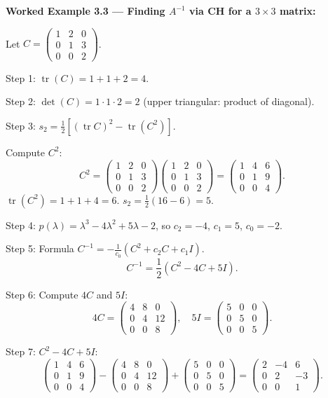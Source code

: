 \documentclass[12pt,a4paper]{article}
\begin{document}
\textbf{Worked Example 3.3 --- Finding $A^{-1}$ via CH for a $3\times3$ matrix:}

Let $C = \begin{pmatrix} 1 & 2 & 0 \\ 0 & 1 & 3 \\ 0 & 0 & 2 \end{pmatrix}$.

Step 1: $\operatorname{tr}(C) = 1+1+2 = 4$.

Step 2: $\det(C) = 1\cdot1\cdot2 = 2$ (upper triangular: product of diagonal).

Step 3: $s_{2} = \tfrac{1}{2}[(\operatorname{tr}C)^{2}-\operatorname{tr}(C^{2})]$.

Compute $C^{2}$:
\[
  C^{2} = \begin{pmatrix}1&2&0\\0&1&3\\0&0&2\end{pmatrix}
          \begin{pmatrix}1&2&0\\0&1&3\\0&0&2\end{pmatrix}
        = \begin{pmatrix}1&4&6\\0&1&9\\0&0&4\end{pmatrix}.
\]
$\operatorname{tr}(C^{2}) = 1+1+4 = 6$.
$s_{2} = \tfrac{1}{2}(16-6) = 5$.

Step 4: $p(\lambda) = \lambda^{3} - 4\lambda^{2} + 5\lambda - 2$,
so $c_{2} = -4$, $c_{1} = 5$, $c_{0} = -2$.

Step 5: Formula $C^{-1} = -\tfrac{1}{c_{0}}(C^{2} + c_{2}C + c_{1}I)$.
\[
  C^{-1} = \frac{1}{2}\!\left(C^{2} - 4C + 5I\right).
\]

Step 6: Compute $4C$ and $5I$:
\[
  4C = \begin{pmatrix}4&8&0\\0&4&12\\0&0&8\end{pmatrix}, \quad
  5I = \begin{pmatrix}5&0&0\\0&5&0\\0&0&5\end{pmatrix}.
\]

Step 7: $C^{2} - 4C + 5I$:
\[
  \begin{pmatrix}1&4&6\\0&1&9\\0&0&4\end{pmatrix}
  -\begin{pmatrix}4&8&0\\0&4&12\\0&0&8\end{pmatrix}
  +\begin{pmatrix}5&0&0\\0&5&0\\0&0&5\end{pmatrix}
  = \begin{pmatrix}2&-4&6\\0&2&-3\\0&0&1\end{pmatrix}.
\]
\end{document}
